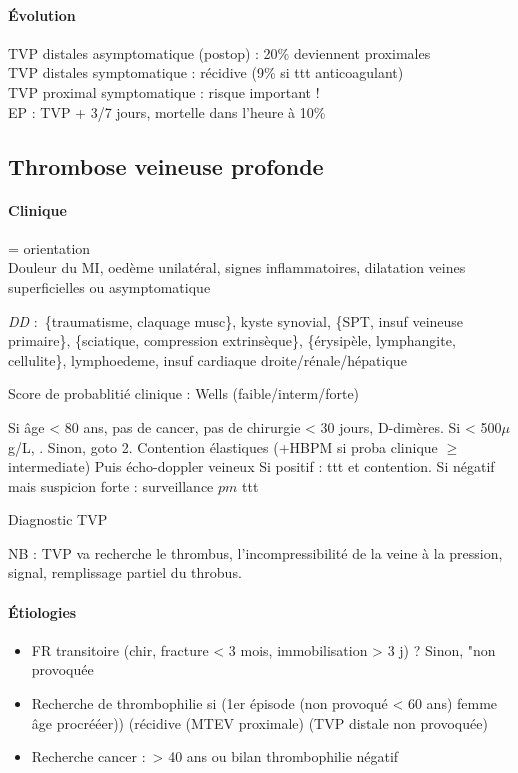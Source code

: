 \documentclass{article}
\begin{document}
\paragraph{Évolution}
TVP distales asymptomatique (postop) : 20\% deviennent proximales\\
TVP distales symptomatique : récidive (9\% si ttt anticoagulant)\\
TVP proximal symptomatique : risque important !\\
EP : TVP + 3/7 jours, mortelle dans l'heure à 10\%

\subsection{Thrombose veineuse profonde}

\paragraph{Clinique} = orientation\\
Douleur du MI, oedème unilatéral, signes inflammatoires, dilatation veines
superficielles ou asymptomatique

\textit{DD}  : \{traumatisme, claquage musc\}, kyste synovial, \{SPT, insuf veineuse
primaire\}, \{sciatique, compression extrinsèque\}, \{érysipèle, lymphangite,
cellulite\}, lymphoedeme, insuf cardiaque droite/rénale/hépatique

Score de probablitié clinique : Wells (faible/interm/forte)

\begin{algorithm}
  Si âge < 80 ans, pas de cancer, pas de chirurgie < 30 jours, D-dimères.
    Si < 500$\mu$g/L, \faHandStopO. Sinon, goto 2.\;
  Contention élastiques (+HBPM si proba clinique $\ge$ intermediate)\;
  Puis écho-doppler veineux\;
  Si positif : ttt et contention. Si négatif mais suspicion forte :
    surveillance $pm$ ttt
\caption{Diagnostic TVP}
\end{algorithm}
NB : TVP va recherche le thrombus, l'incompressibilité de la veine à la
pression, \dec signal, remplissage partiel du throbus.

\paragraph{Étiologies}
\begin{itemize}
  \item FR transitoire (chir, fracture < 3 mois, immobilisation > 3 j) ? Sinon, "non
provoquée
\item Recherche de thrombophilie si (1er épisode (non provoqué < 60 ans) \lor{}
  femme âge procrééer)) \lor{} (récidive (MTEV proximale) \lor (TVP distale non
  provoquée)
\item Recherche cancer : > 40 ans ou bilan thrombophilie négatif
\end{itemize}
\end{document}
